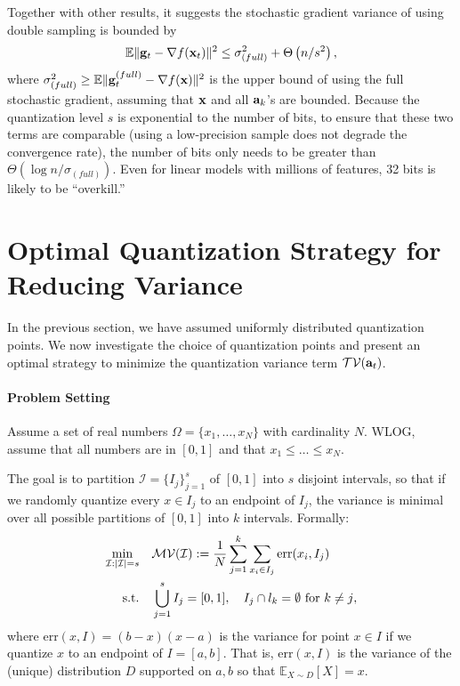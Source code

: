 \documentclass{article}
\def\a{{\bf a}}
\def\g{{\bf g}}
\def\x{{\bf x}}
\def\E{\mathbb{E}}
\newcommand{\err}{\ensuremath{\mathrm{err}}}
\newcommand{\setI}{\mathcal{I}}
\begin{document}
Together with other results, it suggests the stochastic gradient variance of using double sampling is bounded by
\[
\E\|\g_t - \nabla f(\x_t)\|^2 \leq \sigma^2_{(full)} + \Theta \left( {n /s^2} \right),
\]
where $\sigma^2_{(full)} \geq \E \|\g_t^{(full)} - \nabla f(\x)\|^2$ is the upper bound of using the full stochastic gradient, assuming that $\x$ and all $\a_k$'s are bounded. Because the quantization level $s$ is exponential to the number of bits, to ensure that these two terms are comparable (using a low-precision sample does not degrade the convergence rate), the number of bits only needs to be greater than $\Theta (\log n /\sigma_{(full)})$. Even for linear models with millions
of features, 32 bits is likely to be  ``overkill.''






\section{Optimal Quantization Strategy for Reducing Variance} \label{sec:optimal}


In the previous section, we have assumed uniformly distributed quantization points.  
We now investigate the choice of quantization points and present an optimal strategy to minimize the quantization variance term $\mathcal{TV}(\a_t)$.

\paragraph*{Problem Setting}
Assume a set of real numbers $\Omega = \{x_1, \ldots, x_N\}$ with cardinality $N$. WLOG, assume that all numbers are in $[0, 1]$ and that $x_1 \leq \ldots \leq x_N$. 

The goal is to partition $\setI = \{I_j\}_{j = 1}^s$ of $[0, 1]$ into $s$ disjoint intervals, so that if we randomly quantize every $x \in I_j$ to an endpoint of $I_j$, the variance is minimal over all possible partitions of $[0, 1]$ into $k$ intervals.
Formally:
\begin{align}
\nonumber \min_{\setI: |\setI| = s} \quad & \mathcal{MV}(\setI) := {1\over N}\sum_{j = 1}^k \sum_{x_i \in I_j} \err(x_i, I_j)\\
\text{s.t.}\quad & \bigcup_{j = 1}^s I_j = [0, 1],\quad I_j\cap l_k = \emptyset~\text{for $k\neq j$},
\label{eq:opt_Q}
\end{align}
where $\err (x, I) = (b - x) (x - a)$ is the variance for point $x \in I$ if we quantize $x$ to an endpoint of $I = [a, b]$.
That is, $\err (x, I)$ is the variance of the (unique) distribution $D$ supported on ${a, b}$ so that $\E_{X \sim D} [X] = x$.
\end{document}

